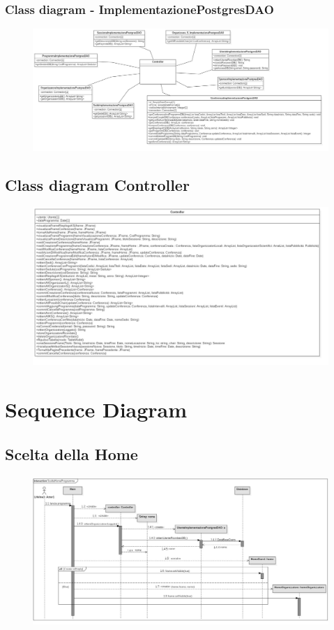 \documentclass[a4paper,italian,10pt,openany]{book}
\begin{document}
\subsection{Class diagram - ImplementazionePostgresDAO}
\vspace{3cm}
\begin{figure}[h!]
\centering
\includegraphics[width=19cm]{ClassDiagram DAO}
\end{figure}
\newpage
\section{Class diagram Controller}
\vspace{5cm}
\begin{figure}[h!]
\centering
\includegraphics[width=16cm]{ClassDiagram CONTROLLER}
\end{figure}
\chapter{Sequence Diagram}
\vspace{4cm}
\section{Scelta della Home}
\begin{figure}[h!]
\centering
\includegraphics[width=18cm]{SD1}
\end{figure}
\newpage
\end{document}
